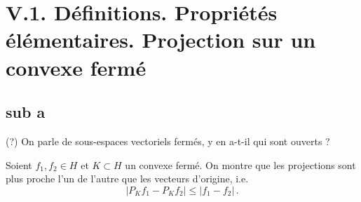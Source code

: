 \documentclass{beamer}
\begin{document}
\section{V.1. Définitions. Propriétés élémentaires. Projection sur un convexe fermé}
\subsection{sub a}
\begin{frame}
  (?) On parle de sous-espaces vectoriels fermés, y en a-t-il qui sont ouverts ?
  \begin{flushleft}
    Soient $f_{1}, f_{2} \in H$ et $K \subset H$ un convexe fermé. On montre que les
    projections sont plus proche l'un de l'autre que les vecteurs d'origine, i.e.
    \[
      \lvert P_{K}f_{1} - P_{K}f_{2} \rvert \le \lvert f_{1} - f_{2} \rvert\,.
    \]
  \end{flushleft}

  \begin{flushleft}
  \end{flushleft}
\end{frame}
\end{document}

